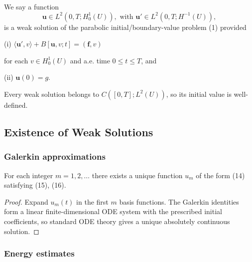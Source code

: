 \begin{definition}
\label{def:weak-solution-parabolic-bvp}
We say a function
\[
\mathbf{u} \in L^2(0,T; H_0^1(U)), \text{ with } \mathbf{u}' \in L^2(0,T; H^{-1}(U)),
\]
is a weak solution of the parabolic initial/boundary-value problem (1) provided

\quad (i) $\langle \mathbf{u}', v \rangle + B[\mathbf{u},v;t] = (\mathbf{f},v)$

for each $v \in H_0^1(U)$ and a.e. time $0 \le t \le T$, and

\quad (ii) $\mathbf{u}(0) = g$.
\end{definition}

\begin{remark}
\label{rem:weak-solution-parabolic-continuity}
Every weak solution belongs to $C([0,T];L^2(U))$, so its initial value is well-defined.
\end{remark}

\subsection{Existence of Weak Solutions}

\subsubsection{Galerkin approximations}

\begin{theorem}
\label{thm:parabolic-galerkin-approximate-solutions}
For each integer $m = 1, 2, \ldots$ there exists a unique function $u_m$ of the form (14) satisfying (15), (16).
\end{theorem}

\begin{proof}
\sketch Expand $u_m(t)$ in the first $m$ basis functions. The Galerkin identities form a linear finite-dimensional ODE system with the prescribed initial coefficients, so standard ODE theory gives a unique absolutely continuous solution.
\end{proof}

\subsubsection{Energy estimates}

